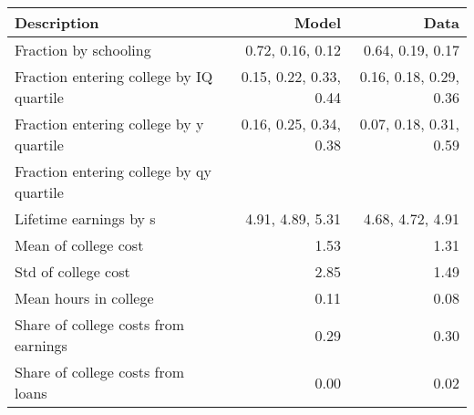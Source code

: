 \begin{tabular}{lrr}
\hline
Description & Model  & Data  \\
\hline
Fraction by schooling & 0.72, 0.16, 0.12  & 0.64, 0.19, 0.17  \\
Fraction entering college by IQ quartile & 0.15, 0.22, 0.33, 0.44  & 0.16, 0.18, 0.29, 0.36  \\
Fraction entering college by y quartile & 0.16, 0.25, 0.34, 0.38  & 0.07, 0.18, 0.31, 0.59  \\
Fraction entering college by qy quartile &   &   \\
Lifetime earnings by s & 4.91, 4.89, 5.31  & 4.68, 4.72, 4.91  \\
Mean of college cost & 1.53  & 1.31  \\
Std of college cost & 2.85  & 1.49  \\
Mean hours in college & 0.11  & 0.08  \\
Share of college costs from earnings & 0.29  & 0.30  \\
Share of college costs from loans & 0.00  & 0.02  \\
\hline
\end{tabular}%
